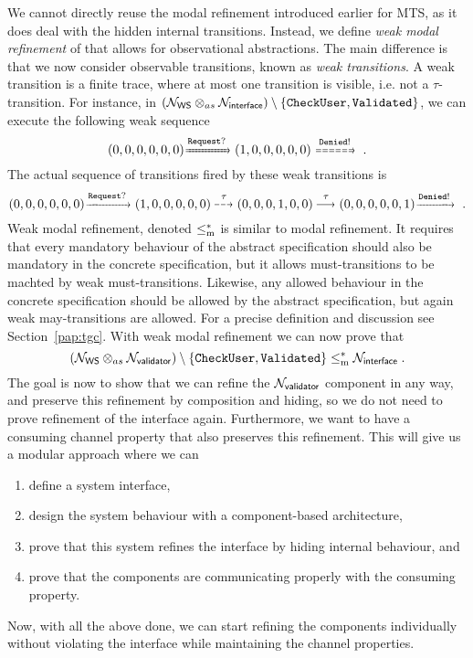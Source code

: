 We cannot directly reuse the modal refinement introduced earlier for MTS, as it does deal with the hidden internal transitions. Instead, we define \emph{weak modal refinement} of \MAIOPNs that allows for observational abstractions. The main difference is that we now consider observable transitions, known as \emph{weak transitions}. 
A weak transition is a finite trace, where at most one transition is visible, i.e. not a $\tau$-transition. For instance, in $(\mathcal{N}_{\mathsf{WS}} \otimes_{as} \mathcal{N}_{\mathsf{interface}}) \setminus \{\mathtt{CheckUser}, \mathtt{Validated}\}$, we can execute the following weak sequence
\[
    (0,0,0,0,0,0) \lmustw{\transition{Request?}} (1,0,0,0,0,0) \lmayw{\transition{Denied!}}  \;.
\] The actual sequence of transitions fired by these weak transitions is 
\[
    (0,0,0,0,0,0) \lmust{\transition{Request?}} (1,0,0,0,0,0) \may{\transition{\tau}}(0,0,0,1,0,0)\must{\transition{\tau}}(0,0,0,0,0,1)\lmust{\transition{Denied!}} \;. 
\]
    Weak modal refinement, denoted $\le^*_\mathrm m$ is similar to modal refinement. It requires that every mandatory behaviour of the abstract specification should also be mandatory in the concrete specification, but it allows must-transitions to be machted by  weak must-transitions. Likewise, any allowed behaviour in the concrete specification should be allowed by the abstract specification, but again weak may-transitions are allowed. For a precise definition and discussion see Section~\ref{pap:tgc}. With weak modal refinement we can now prove that 
\[
    (\mathcal{N}_{\mathsf{WS}} \otimes_{as} \mathcal{N}_{\mathsf{validator}})\setminus \{\mathtt{CheckUser}, \mathtt{Validated}\} \le^*_\mathrm m \mathcal{N}_{\mathsf{interface}} \;.
\]
The goal is now to show that we can refine the $\mathcal{N}_{\mathsf{validator}}$ component in any way, and preserve this refinement by composition and hiding, so we do not need to prove refinement of the interface again. Furthermore, we want to have a consuming channel property that also preserves this refinement. This will give us a modular approach where we can 
\begin{enumerate}
    \item define a system interface,
    \item design the system behaviour with a component-based architecture,
    \item prove that this system refines the interface by hiding internal behaviour, and
    \item prove that the components are communicating properly with the consuming property.
\end{enumerate}
Now, with all the above done, we can start refining the components individually without violating the interface while maintaining the channel properties.

